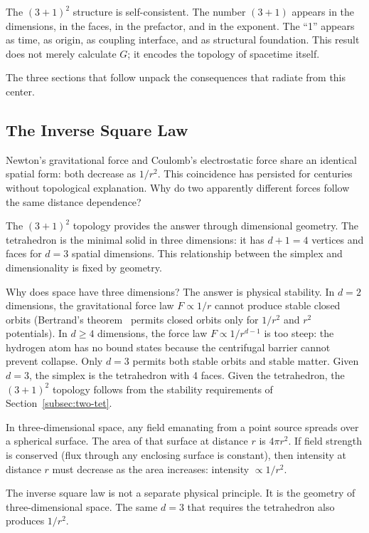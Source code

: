 \documentclass[aps,prd,preprint,superscriptaddress,showpacs,preprintnumbers,amsmath,amssymb,nofootinbib]{revtex4-2}
\begin{document}
The $(3+1)^2$ structure is self-consistent. The number $(3+1)$ appears in the dimensions, in the faces, in the prefactor, and in the exponent. The ``1'' appears as time, as origin, as coupling interface, and as structural foundation. This result does not merely calculate $G$; it encodes the topology of spacetime itself.

The three sections that follow unpack the consequences that radiate from this center.

\subsection{The Inverse Square Law}
\label{subsec:inverse-square}

Newton's gravitational force and Coulomb's electrostatic force share an identical spatial form: both decrease as $1/r^2$. This coincidence has persisted for centuries without topological explanation. Why do two apparently different forces follow the same distance dependence?

The $(3+1)^2$ topology provides the answer through dimensional geometry. The tetrahedron is the minimal solid in three dimensions: it has $d + 1 = 4$ vertices and faces for $d = 3$ spatial dimensions. This relationship between the simplex and dimensionality is fixed by geometry.

Why does space have three dimensions? The answer is physical stability. In $d = 2$ dimensions, the gravitational force law $F \propto 1/r$ cannot produce stable closed orbits (Bertrand's theorem~\cite{goldstein2002} permits closed orbits only for $1/r^2$ and $r^2$ potentials). In $d \geq 4$ dimensions, the force law $F \propto 1/r^{d-1}$ is too steep: the hydrogen atom has no bound states because the centrifugal barrier cannot prevent collapse. Only $d = 3$ permits both stable orbits and stable matter. Given $d = 3$, the simplex is the tetrahedron with 4 faces. Given the tetrahedron, the $(3+1)^2$ topology follows from the stability requirements of Section~\ref{subsec:two-tet}.

In three-dimensional space, any field emanating from a point source spreads over a spherical surface. The area of that surface at distance $r$ is $4\pi r^2$. If field strength is conserved (flux through any enclosing surface is constant), then intensity at distance $r$ must decrease as the area increases: intensity $\propto 1/r^2$.

The inverse square law is not a separate physical principle. It is the geometry of three-dimensional space. The same $d = 3$ that requires the tetrahedron also produces $1/r^2$.
\end{document}
